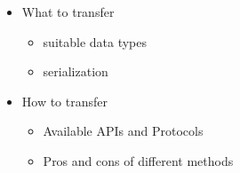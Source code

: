 

\begin{itemize}[noitemsep]
	\item What to transfer
		\begin{itemize}
			\item suitable data types
			\item serialization
		\end{itemize}
	\item How to transfer
		\begin{itemize}
			\item Available APIs and Protocols
			\item Pros and cons of different methods
		\end{itemize}
\end{itemize}
\lipsum[1]
\lipsum[2]
\lipsum[3]
\lipsum[4]
\lipsum[5]
\lipsum[1]
\lipsum[2]
\lipsum[3]
\lipsum[4]
\lipsum[5]
\lipsum[2]
\lipsum[3]
\lipsum[4]
\lipsum[5]


\clearpage